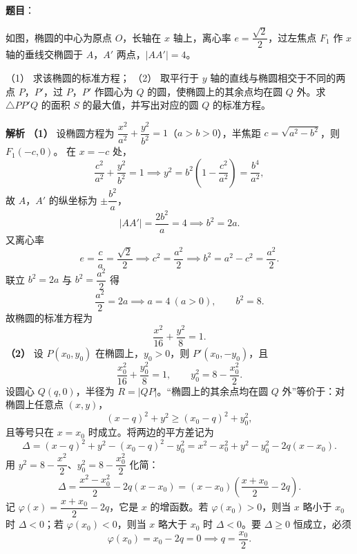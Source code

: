 \begin{answer}

\textbf{题目}：

如图，椭圆的中心为原点 $O$，长轴在 $x$ 轴上，离心率 $e=\dfrac{\sqrt2}2$，过左焦点 $F_1$ 作 $x$ 轴的垂线交椭圆于 $A$，$A'$ 两点，$|AA'|=4$。
\nopagebreak[4]
\begin{center}\end{center}
\nopagebreak[4]
（1） 求该椭圆的标准方程；
（2） 取平行于 $y$ 轴的直线与椭圆相交于不同的两点 $P$，$P'$，过 $P$，$P'$ 作圆心为 $Q$ 的圆，使椭圆上的其余点均在圆 $Q$ 外。求 $\triangle PP'Q$ 的面积 $S$ 的最大值，并写出对应的圆 $Q$ 的标准方程。

\textbf{解析}
\textbf{（1）} 设椭圆方程为 $\dfrac{x^2}{a^2}+\dfrac{y^2}{b^2}=1$（$a>b>0$），半焦距 $c=\sqrt{a^2-b^2}$，则 $F_1(-c,0)$。
在 $x=-c$ 处，
\nopagebreak[4]
\[\frac{c^2}{a^2}+\frac{y^2}{b^2}=1\implies y^2=b^2\left(1-\frac{c^2}{a^2}\right)=\frac{b^4}{a^2},\]
故 $A$，$A'$ 的纵坐标为 $\pm\dfrac{b^2}a$，
\nopagebreak[4]
\[|AA'|=\frac{2b^2}a=4\implies b^2=2a.\]
又离心率
\nopagebreak[4]
\[e=\frac ca=\frac{\sqrt2}2\implies c^2=\frac{a^2}2\implies b^2=a^2-c^2=\frac{a^2}2.\]
联立 $b^2=2a$ 与 $b^2=\dfrac{a^2}2$ 得
\nopagebreak[4]
\[\frac{a^2}2=2a\implies a=4\ (a>0),\qquad b^2=8.\]
故椭圆的标准方程为
\nopagebreak[4]
\[\frac{x^2}{16}+\frac{y^2}8=1.\]
\textbf{（2）} 设 $P(x_0,y_0)$ 在椭圆上，$y_0>0$，则 $P'(x_0,-y_0)$，且
\nopagebreak[4]
\[\frac{x_0^2}{16}+\frac{y_0^2}8=1,\qquad y_0^2=8-\frac{x_0^2}2.\]
设圆心 $Q(q,0)$，半径为 $R=|QP|$。“椭圆上的其余点均在圆 $Q$ 外”等价于：对椭圆上任意点 $(x,y)$，
\nopagebreak[4]
\[(x-q)^2+y^2\geqslant(x_0-q)^2+y_0^2,\]
且等号只在 $x=x_0$ 时成立。将两边的平方差记为
\nopagebreak[4]
\[\Delta=(x-q)^2+y^2-(x_0-q)^2-y_0^2=x^2-x_0^2+y^2-y_0^2-2q(x-x_0).\]
用 $y^2=8-\dfrac{x^2}2$、$y_0^2=8-\dfrac{x_0^2}2$ 化简：
\nopagebreak[4]
\[\Delta=\frac{x^2-x_0^2}2-2q(x-x_0)=(x-x_0)\left(\frac{x+x_0}2-2q\right).\]
记 $\varphi(x)=\dfrac{x+x_0}2-2q$，它是 $x$ 的增函数。若 $\varphi(x_0)>0$，则当 $x$ 略小于 $x_0$ 时 $\Delta<0$；若 $\varphi(x_0)<0$，则当 $x$ 略大于 $x_0$ 时 $\Delta<0$。要 $\Delta\geqslant0$ 恒成立，必须
\nopagebreak[4]
\[\varphi(x_0)=x_0-2q=0\implies q=\frac{x_0}2.\]

\end{answer}
